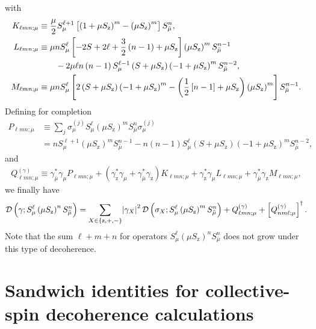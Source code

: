 \documentclass[aps,notitlepage,nofootinbib,11pt]{revtex4-1}
\newcommand{\f}[2]{\dfrac{#1}{#2}} %
\newcommand{\p}[1]{\left(#1\right)} %
\renewcommand{\sp}[1]{\left[#1\right]} %
\renewcommand{\set}[1]{\left\{#1\right\}} %
\newcommand{\D}{\mathcal{D}}
\newcommand{\z}{\text{z}}
\newcommand{\bmu}{{\bar\mu}}
\newcommand{\1}{\mathds{1}}
\begin{document}
with
\begin{align}
  K_{\ell mn;\mu}
  &\equiv \f{\mu}{2} S_\mu^{\ell+1}
  \sp{\p{1+\mu S_\z}^m-\p{\mu S_\z}^m} S_\bmu^n, \\
  L_{\ell mn;\mu}
  &\equiv \mu n S_\mu^\ell \sp{-2S+2\ell+\f32\p{n-1}+\mu S_\z}
  \p{\mu S_\z}^m S_\bmu^{n-1} \notag \\
  &\qquad - 2\mu\ell n\p{n-1} S_\mu^{\ell-1}
  \p{S+\mu S_\z} \p{-1+\mu S_\z}^m S_\bmu^{n-2}, \\
  M_{\ell mn;\mu}
  &\equiv \mu n S_\mu^\ell \sp{2\p{S+\mu S_\z}\p{-1+\mu S_\z}^m
    - \p{\f12\sp{n-1}+\mu S_\z}\p{\mu S_\z}^m} S_\bmu^{n-1}.
\end{align}
Defining for completion
\begin{align}
  P_{\ell mn;\mu}
  &\equiv \sum_j \sigma_\mu^{(j)} S_\mu^\ell
  \p{\mu S_\z}^m S_\bmu^n \sigma_\mu^{(j)} \\
  &= n S_\mu^{\ell+1} \p{\mu S_\z}^m S_\bmu^{n-1}
  - n\p{n-1} S_\mu^\ell \p{S+\mu S_\z} \p{-1+\mu S_\z}^m S_\bmu^{n-2},
\end{align}
and
\begin{align}
  Q_{\ell mn;\mu}^{(\gamma)}
  \equiv \gamma_\bmu^* \gamma_\mu P_{\ell mn;\mu}
  + \p{\gamma_\z^* \gamma_\mu + \gamma_\bmu^* \gamma_\z}
  K_{\ell mn;\mu}
  + \gamma_\z^* \gamma_\mu L_{\ell mn;\mu}
  + \gamma_\bmu^* \gamma_\z M_{\ell mn;\mu},
  \label{eq:Q_single}
\end{align}
we finally have
\begin{align}
  \D\p{\gamma; S_\mu^\ell \p{\mu S_\z}^n S_\bmu^n}
  = \sum_{X\in\set{\z,+,-}} \abs{\gamma_X}^2
  \D\p{\sigma_X; S_\mu^\ell \p{\mu S_\z}^m S_\bmu^n}
  + Q_{\ell mn;\mu}^{(\gamma)} + \sp{Q_{nm\ell;\mu}^{(\gamma)}}^\dag.
\end{align}
Note that the sum $\ell+m+n$ for operators
$S_\mu^\ell \p{\mu S_\z}^n S_\bmu^n$ does not grow under this type of
decoherence.


\section{Sandwich identities for collective-spin decoherence
  calculations}
\label{sec:sandwich_collective}
\end{document}
